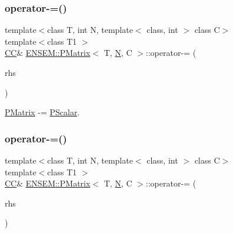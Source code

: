 \subsubsection{\texorpdfstring{operator-\/=()}{operator-=()}\hspace{0.1cm}{\footnotesize\ttfamily [4/6]}}
{\footnotesize\ttfamily template$<$class T, int N, template$<$ class, int $>$ class C$>$ \\
template$<$class T1 $>$ \\
\mbox{\hyperlink{classENSEM_1_1PMatrix_a744bac549029029effe32dc1705660ec}{CC}}\& \mbox{\hyperlink{classENSEM_1_1PMatrix}{E\+N\+S\+E\+M\+::\+P\+Matrix}}$<$ T, \mbox{\hyperlink{adat__devel_2lib_2hadron_2operator__name__util_8cc_a7722c8ecbb62d99aee7ce68b1752f337}{N}}, C $>$\+::operator-\/= (\begin{DoxyParamCaption}\item[{const \mbox{\hyperlink{classENSEM_1_1PScalar}{P\+Scalar}}$<$ T1 $>$ \&}]{rhs }\end{DoxyParamCaption})\hspace{0.3cm}{\ttfamily [inline]}}



\mbox{\hyperlink{classENSEM_1_1PMatrix}{P\+Matrix}} -\/= \mbox{\hyperlink{classENSEM_1_1PScalar}{P\+Scalar}}. 

\mbox{\label{classENSEM_1_1PMatrix_ad33381d53cc105f6f64869316aa0e2c2}} 
\subsubsection{\texorpdfstring{operator-\/=()}{operator-=()}\hspace{0.1cm}{\footnotesize\ttfamily [5/6]}}
{\footnotesize\ttfamily template$<$class T, int N, template$<$ class, int $>$ class C$>$ \\
template$<$class T1 $>$ \\
\mbox{\hyperlink{classENSEM_1_1PMatrix_a744bac549029029effe32dc1705660ec}{CC}}\& \mbox{\hyperlink{classENSEM_1_1PMatrix}{E\+N\+S\+E\+M\+::\+P\+Matrix}}$<$ T, \mbox{\hyperlink{adat__devel_2lib_2hadron_2operator__name__util_8cc_a7722c8ecbb62d99aee7ce68b1752f337}{N}}, C $>$\+::operator-\/= (\begin{DoxyParamCaption}\item[{const \mbox{\hyperlink{classENSEM_1_1PScalar}{P\+Scalar}}$<$ T1 $>$ \&}]{rhs }\end{DoxyParamCaption})\hspace{0.3cm}{\ttfamily [inline]}}



